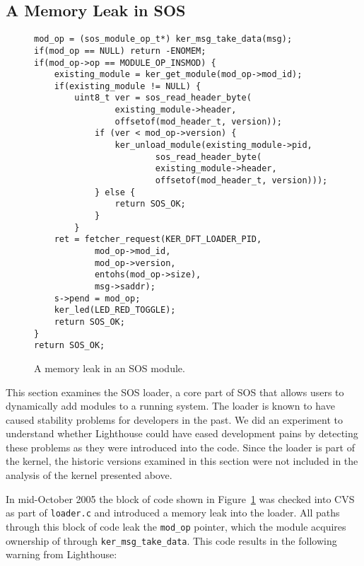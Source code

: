 \subsection{A Memory Leak in SOS}
\label{ss:tale}



\begin{figure}[tp]
\begin{scriptsize}
\begin{verbatim}
mod_op = (sos_module_op_t*) ker_msg_take_data(msg);
if(mod_op == NULL) return -ENOMEM;
if(mod_op->op == MODULE_OP_INSMOD) {
    existing_module = ker_get_module(mod_op->mod_id);
    if(existing_module != NULL) {
        uint8_t ver = sos_read_header_byte(
                existing_module->header,
                offsetof(mod_header_t, version));
            if (ver < mod_op->version) {
                ker_unload_module(existing_module->pid, 
                        sos_read_header_byte(
                        existing_module->header,
                        offsetof(mod_header_t, version)));
            } else {
                return SOS_OK;
            }
        }
    ret = fetcher_request(KER_DFT_LOADER_PID,
            mod_op->mod_id,
            mod_op->version,
            entohs(mod_op->size),
            msg->saddr);
    s->pend = mod_op;
    ker_led(LED_RED_TOGGLE);
    return SOS_OK;
}
return SOS_OK;
\end{verbatim}
\end{scriptsize}
\caption{\label{fig:leak}A memory leak in an SOS module.}
\end{figure}



This section examines the SOS loader, a core part of SOS that allows users
to dynamically add modules to a running system.  
%
The loader is known to have caused stability problems for developers in the
past.  We did an experiment to understand whether Lighthouse could have
eased development pains by detecting these problems as they were introduced
into the code.  
%
Since the loader is part of the kernel, the historic versions examined in
this section were not included in the analysis of the kernel presented
above.



In mid-October 2005 the block of code shown in Figure~\ref{fig:leak} was
checked into CVS as part of {\tt loader.c} and introduced a memory leak into
the loader.  
%
All paths through this block of code leak the {\tt mod\_op} pointer, which
the module acquires ownership of through {\tt ker\_msg\_take\_data}.  
%
This code results in the following warning from Lighthouse:



